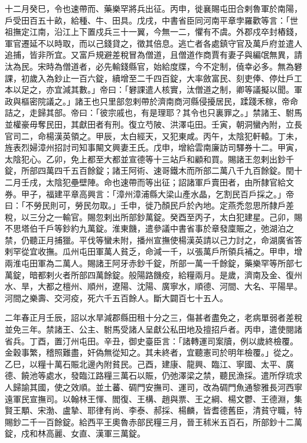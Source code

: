 \begin{pinyinscope}
 十二月癸巳，令也速帶而、藥樂罕將兵出征。丙申，徙襄賜屯田合剌魯軍於南陽，戶受田百五十畝，給種、牛、田具。戊戌，中書省臣同河南平章孛羅歡等言：「世祖撫定江南，沿江上下置戍兵三十一翼，今無一二，懼有不虞。外郡戍卒封樁錢，軍官遷延不以時取，而以己錢貸之，徵其倍息。逃亡者各處鎮守官及萬戶府並遣人追捕，皆非所宜。又富戶規避差稅冒為僧道，且僧道作商賈有妻子與編氓無異，請汰為民。宋時為僧道者，必先輸錢縣官，始給度牒，今不定制，僥幸必多。無為礬課，初歲入為鈔止一百六錠，續增至二千四百錠，大率斂富民、刻吏俸、停灶戶工本以足之，亦宜減其數。」帝曰：「礬課遣人核實，汰僧道之制，卿等議擬以聞。軍政與樞密院議之。」諸王也只里部忽剌帶於濟南商河縣侵擾居民，蹂踐禾稼，帝命詰之，走歸其部。帝曰：「彼宗戚也，有是理耶？其令也只裏罪之。」禁諸王、駙馬並權豪毋奪民田，其獻田者有刑。復立芍陂、洪澤屯田。壬寅，朝洞蠻內附，立長官司二，命楊漢英領之。甲辰，太白經天，又犯東咸。丙午，太陰犯軒轅。丁未，旌表烈婦漳州招討司知事闞文興妻王氏。戊申，增給雲南廉訪司驛券十二。甲寅，太陰犯心。乙卯，免上都至大都並宣德等十三站戶和顧和買。賜諸王忽剌出鈔千錠，所部四萬四千五百餘錠；諸王阿術、速哥鐵木而所部二萬八千九百餘錠。閏十二月壬戌，太陰犯壘壁陣。命也速帶而等出征；詔諸軍戶賣田者，由所隸官給文券。甲子，福建平章高興言：「漳州漳浦縣大梁山產水晶，乞割民百戶採之。」帝曰：「不勞民則可，勞民勿取。」壬申，徙乃顏民戶於內地。定燕禿忽思所隸戶差稅，以三分之一輸官。賜忽剌出所部鈔萬錠。癸酉至丙子，太白犯建星。己卯，賜不思塔伯千戶等鈔約九萬錠。淮東饑，遣參議中書省事於章發廩賑之，弛湖泊之禁，仍聽正月捕獵。平伐等蠻未附，播州宣撫使楊漢英請以己力討之，命湖廣省答剌罕從宜收撫。瓜州屯田軍萬人貧乏，命減一千，以張萬戶所領兵補之。甲申，增兩淮屯田軍為二萬人。賜諸王阿牙赤鈔千錠，所部一萬一千餘錠，藥樂罕等所部七萬錠，暗都剌火者所部四萬餘錠。般陽路饑疫，給糧兩月。是歲，濟南及金、復州水、旱，大都之檀州、順州，遼陽、沈陽、廣寧水，順德、河間、大名、平陽旱。河間之樂壽、交河疫，死六千五百餘人。斷大闢百七十五人。



 二年春正月壬辰，詔以水旱減郡縣田租十分之三，傷甚者盡免之，老病單弱者差稅並免三年。禁諸王、公主、駙馬受諸人呈獻公私田地及擅招戶者。丙申，遣使閱諸省兵。丁酉，置汀州屯田。辛丑，御史臺臣言：「諸轉運司案牘，例以歲終檢覆。金穀事繁，稽照難盡，奸偽無從知之。其未終者，宜聽憲司於明年檢覆。」從之。乙巳，以糧十萬石賑北邊內附貧民。己酉，建康、龍興、臨江、寧國、太平、廣德、饒池等處水，發臨江路糧三萬石以賑，仍弛澤梁之禁，聽民漁採。遣所俘琉求人歸諭其國，使之效順。並土蕃、碉門安撫司、運司，改為碉門魚通黎雅長河西寧遠軍民宣撫司。以翰林王惲、閻復、王構、趙與票、王之綱、楊文鬱、王德淵，集賢王顒、宋渤、盧摯、耶律有尚、李泰、郝採、楊麟，皆耆德舊臣，清貧守職，特賜鈔二千一百餘錠。給西平王奧魯赤部民糧三月，晉王秫米五百石，所部鈔十二萬錠，戍和林高麗、女直、漢軍三萬錠。




\end{pinyinscope}
